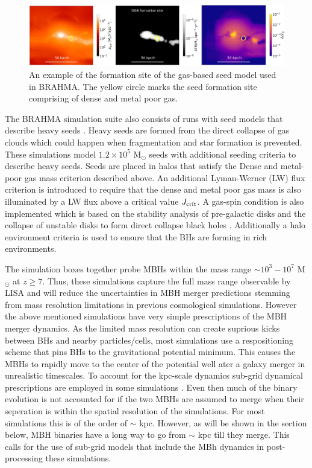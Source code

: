 \documentclass[11pt, letterpaper]{article}
\newcommand{\msun}{M$_{\odot}$}
\begin{document}
\begin{figure}[!htb]
    \centering
    \includegraphics[width=0.9\linewidth]{fig/brahma-seeding.jpeg}
    \caption{An example of the formation site of the gas-based seed model used in BRAHMA. The yellow circle marks the seed formation site comprising of dense and metal poor gas.}
    \label{fig:brahma-seeding-example}
\end{figure}

The BRAHMA simulation suite also consists of runs with seed models that describe heavy seeds \cite{bhowmick2024growthhighredshiftsupermassive}. Heavy seeds are formed from the direct collapse of gas clouds which could happen when fragmentation and star formation is prevented. These 
simulations model $1.2 \times 10^{5}$ \msun{} seeds with additional seeding criteria to describe heavy seeds. Seeds are placed in halos that satisfy the Dense and metal-poor gas mass criterion described above. An additional Lyman-Werner (LW) flux criterion is introduced to require that the dense and metal poor gas mass is also illuminated by a LW flux above a critical value $J_{\rm crit}$. A gas-spin condition is also implemented which is based on the stability analysis of pre-galactic disks and the collapse of unstable disks to form direct collapse black holes \citep{Lodato2006, natarajan2023detectionovermassiveblackhole,Natarajan2012,DeGraf_2019}. Additionally a halo environment criteria is used to ensure that the BHs are forming in rich environments. 


The simulation boxes together probe MBHs within the mass range $\sim 10^3 - 10^7$ \msun{} at $z \geq 7$. Thus, these simulations capture the full mass range observable by LISA and will reduce the uncertainties in MBH merger predictions stemming from mass resolution limitations in previous cosmological simulations. However the above mentioned simulations have very simple prescriptions of the MBH merger dynamics. As the limited mass resolution can create suprious kicks between BHs and nearby particles/cells, most simulations use a respositioning scheme that pins BHs to the gravitational potential minimum. This causes the MBHs to rapidly move to the center of the potential well ater a galaxy merger in unrealistic timescales. To account for the kpc-scale dynamics sub-grid dynamical prescriptions are employed in some simulations \cite{Volonteri_2020,DeGraf_2021}. Even then much of the binary evolution is not accounted for if the two MBHs are assumed to merge when their seperation is within the spatial resolution of the simulations. For most simulations this is of the order of $\sim$ kpc. However, as will be shown in the section below, MBH binaries have a long way to go from $\sim$ kpc till they merge. This calls for the use of sub-grid models that include the MBh dynamics in post-processing these simulations. 
\end{document}

